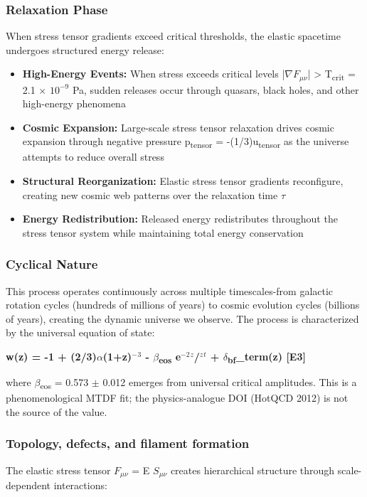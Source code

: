 \documentclass[11pt,a4paper]{article}
\begin{document}
\subsubsection{Relaxation Phase}
When stress tensor gradients exceed critical thresholds, the elastic spacetime undergoes structured energy release:

\begin{itemize}
  \item \textbf{High-Energy Events:} When stress exceeds critical levels |$\nabla$$F_{\mu\nu}$| > T\textsubscript{crit} = 2.1 $\times$ $10^{-9}$ Pa, sudden releases occur through quasars, black holes, and other high-energy phenomena
  \item \textbf{Cosmic Expansion:} Large-scale stress tensor relaxation drives cosmic expansion through negative pressure p\textsubscript{tensor} = -(1/\allowbreak{}3)u\textsubscript{tensor} as the universe attempts to reduce overall stress
  \item \textbf{Structural Reorganization:} Elastic stress tensor gradients reconfigure, creating new cosmic web patterns over the relaxation time $\tau$
  \item \textbf{Energy Redistribution:} Released energy redistributes throughout the stress tensor system while maintaining total energy conservation
\end{itemize}

\subsubsection{Cyclical Nature}
This process operates continuously across multiple timescales-from galactic rotation cycles (hundreds of millions of years) to cosmic evolution cycles (billions of years), creating the dynamic universe we observe. The process is characterized by the universal equation of state:

\textbf{w(z) = -1 + (2/\allowbreak{}3)$\alpha$(1+z)$^{-}$$^{3}$ - $\beta$\textsubscript{eos} e$^{-2}$$^{z}$/$^{z}$$^{t}$ + $\delta$\textsubscript{bf}\_\allowbreak{}term(z) [E3]}

where $\beta$\textsubscript{eos} = 0.573 $\pm$ 0.012 emerges from universal critical amplitudes. This is a phenomenological MTDF fit; the physics-analogue DOI (HotQCD 2012) is not the source of the value.

\subsubsection{Topology, defects, and filament formation}
The elastic stress tensor $F_{\mu\nu}$ = E $S_{\mu\nu}$ creates hierarchical structure through scale-dependent interactions:
\end{document}

